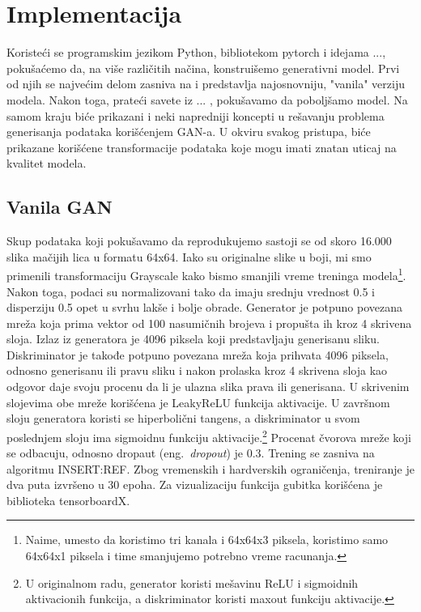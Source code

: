 \documentclass[a4paper]{article}
\begin{document}
\section{Implementacija}
Koristeći se programskim jezikom Python, bibliotekom pytorch i idejama ..., pokušaćemo da, na više različitih načina, konstruišemo generativni model. Prvi od njih se najvećim delom zasniva na \cite{goodfellow2014generative} i predstavlja najosnovniju, "vanila" verziju modela. Nakon toga, prateći savete iz ... , pokušavamo da poboljšamo model. Na samom kraju biće prikazani i neki napredniji koncepti u rešavanju problema generisanja podataka korišćenjem GAN-a. U okviru svakog pristupa, biće prikazane korišćene transformacije podataka koje mogu imati znatan uticaj na kvalitet modela. %

\subsection{Vanila GAN}
 Skup podataka koji pokušavamo da reprodukujemo sastoji se od skoro 16.000 slika mačijih lica u formatu 64x64. Iako su originalne slike u boji, mi smo primenili transformaciju Grayscale kako bismo smanjili vreme treninga modela\footnote{Naime, umesto da koristimo tri kanala i 64x64x3 piksela, koristimo samo 64x64x1 piksela i time smanjujemo potrebno vreme racunanja.}. Nakon toga, podaci su normalizovani tako da imaju srednju vrednost 0.5 i disperziju 0.5 opet u svrhu lakše i bolje obrade. Generator je potpuno povezana mreža koja prima vektor od 100 nasumičnih brojeva i propušta ih kroz 4 skrivena sloja. Izlaz iz generatora je 4096 piksela koji predstavljaju generisanu sliku. Diskriminator je takođe potpuno povezana mreža koja prihvata 4096 piksela, odnosno generisanu ili pravu sliku i nakon prolaska kroz 4 skrivena sloja kao odgovor daje svoju procenu da li je ulazna slika prava ili generisana. U skrivenim slojevima obe mreže korišćena je LeakyReLU funkcija aktivacije. U završnom sloju generatora koristi se hiperbolični tangens, a diskriminator u svom poslednjem sloju ima sigmoidnu funkciju aktivacije.\footnote{U originalnom radu, generator koristi mešavinu ReLU i sigmoidnih aktivacionih funkcija, a diskriminator koristi maxout funkciju aktivacije.} Procenat čvorova mreže koji se odbacuju, odnosno dropaut (eng.~{\em dropout}) je 0.3. Trening se zasniva na algoritmu INSERT:REF. Zbog vremenskih i hardverskih ograničenja, treniranje je dva puta izvršeno u 30 epoha. Za vizualizaciju funkcija gubitka korišćena je biblioteka tensorboardX.
 
\end{document}
